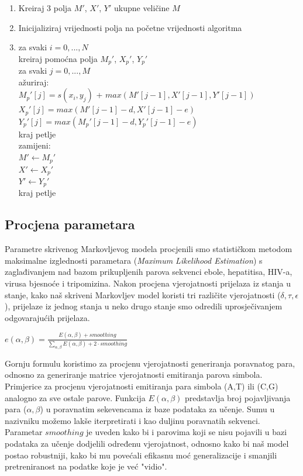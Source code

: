 \documentclass[a4paper]{article}
\newcommand\tab[1][1cm]{\hspace*{#1}}
\begin{document}
\begin{enumerate}
  \item Kreiraj 3 polja $M'$, $X'$, $Y'$ ukupne veličine $M$ 
  \item Inicijaliziraj vrijednosti polja na početne vrijednosti algoritma
  \item za svaki $i = 0,...,N$\\
        \tab kreiraj pomoćna polja $M_p'$, $X_p'$, $Y_p'$\\
        \tab za svaki $j = 0,...,M$\\
           \tab \tab ažuriraj:\\
            \tab \tab  $M_p'[j] = s(x_i,y_j)$ + $max(M'[j - 1], X'[j - 1], Y'[j - 1])$\\
            \tab \tab $X_p'[j] = max(M'[j - 1] - d, X'[j - 1] - e)$\\
            \tab \tab $Y_p'[j] = max(M_p'[j - 1] - d, Y_p'[j - 1] - e)$\\
        \tab kraj petlje\\
        \tab zamijeni: \\
        \tab \tab $M' \leftarrow M_p'$\\
        \tab \tab $X' \leftarrow X_p'$\\
        \tab \tab $Y' \leftarrow Y_p'$\\
        kraj petlje
 
\end{enumerate}



\subsection{Procjena parametara}
Parametre skrivenog Markovljevog modela procjenili smo statističkom metodom  maksimalne izglednosti parametara (\textit{Maximum Likelihood Estimation}) s zaglađivanjem nad bazom prikupljenih parova sekvenci ebole, hepatitisa, HIV-a, virusa bjesnoće i  tripomizina. Nakon procjena vjerojatnosti prijelaza iz stanja u stanje, kako naš skriveni Markovljev model koristi tri različite vjerojatnosti ($\delta, \tau , \epsilon$), prijelaze iz jednog stanja u neko drugo stanje smo odredili uprosječivanjem odgovarajućih prijelaza.\\
\begin{center}
$e(\alpha, \beta) = \frac{E(\alpha, \beta) + smoothing}{\sum_{\alpha, \beta} E(\alpha, \beta)  + 2\cdot smoothing}$
\end{center}

Gornju formulu koristimo za procjenu vjerojatnosti generiranja poravnatog para, odnosno za generiranje matrice vjerojatnosti emitiranja parova simbola. Primjerice za procjenu vjerojatnosti emitiranja para simbola (A,T) ili (C,G) analogno za sve ostale parove. Funkcija $E(\alpha, \beta)$ predstavlja broj pojavljivanja para ($\alpha, \beta$) u poravnatim sekevencama iz baze podataka za učenje. Sumu u nazivniku možemo lakše iterpretirati i kao duljinu poravnatih sekvenci. Parametar $smoothing$ je uveden kako bi i parovima koji se nisu pojavili u bazi podataka za učenje dodjelili određenu vjerojatnost, odnosno kako bi naš model postao robustniji, kako bi mu povećali efikasnu moć generalizacije i smanjili pretreniranost na podatke koje je već "vidio". 
\end{document}
